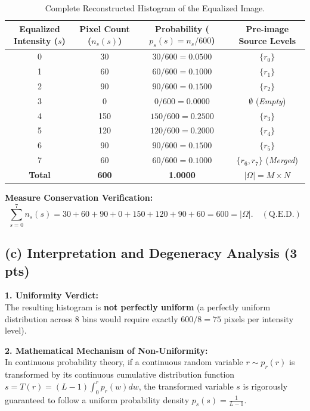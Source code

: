 \documentclass[11pt,a4paper]{article}
\begin{document}
\begin{table}[htbp]
\centering
\caption{Complete Reconstructed Histogram of the Equalized Image.}
\label{tab:p5_equalized_hist}
\begin{tabular}{cccc}
\toprule
\textbf{Equalized Intensity ($s$)} & \textbf{Pixel Count ($n_s(s)$)} & \textbf{Probability ($p_s(s) = n_s/600$)} & \textbf{Pre-image Source Levels} \\
\midrule
0 & 30  & $30 / 600 = 0.0500$  & $\{r_0\}$ \\
1 & 60  & $60 / 600 = 0.1000$  & $\{r_1\}$ \\
2 & 90  & $90 / 600 = 0.1500$  & $\{r_2\}$ \\
3 & 0   & $0 / 600 = 0.0000$   & $\emptyset$ (\textit{Empty}) \\
4 & 150 & $150 / 600 = 0.2500$ & $\{r_3\}$ \\
5 & 120 & $120 / 600 = 0.2000$ & $\{r_4\}$ \\
6 & 90  & $90 / 600 = 0.1500$  & $\{r_5\}$ \\
7 & 60  & $60 / 600 = 0.1000$  & $\{r_6, r_7\}$ (\textit{Merged}) \\
\midrule
\textbf{Total} & \textbf{600} & \textbf{1.0000} & $|\Omega| = M \times N$ \\
\bottomrule
\end{tabular}
\end{table}

\noindent\textbf{Measure Conservation Verification:}
\begin{equation}
\sum_{s=0}^7 n_s(s) = 30 + 60 + 90 + 0 + 150 + 120 + 90 + 60 = 600 = |\Omega|. \quad (\text{Q.E.D.})
\end{equation}

\subsection{(c) Interpretation and Degeneracy Analysis (3 pts)}
\noindent\textbf{1. Uniformity Verdict:}\\
The resulting histogram is \textbf{not perfectly uniform} (a perfectly uniform distribution across 8 bins would require exactly $600 / 8 = 75$ pixels per intensity level).

\noindent\textbf{2. Mathematical Mechanism of Non-Uniformity:}\\
In continuous probability theory, if a continuous random variable $r \sim p_r(r)$ is transformed by its continuous cumulative distribution function $s = T(r) = (L-1)\int_0^r p_r(w)dw$, the transformed variable $s$ is rigorously guaranteed to follow a uniform probability density $p_s(s) = \frac{1}{L-1}$.
\end{document}
